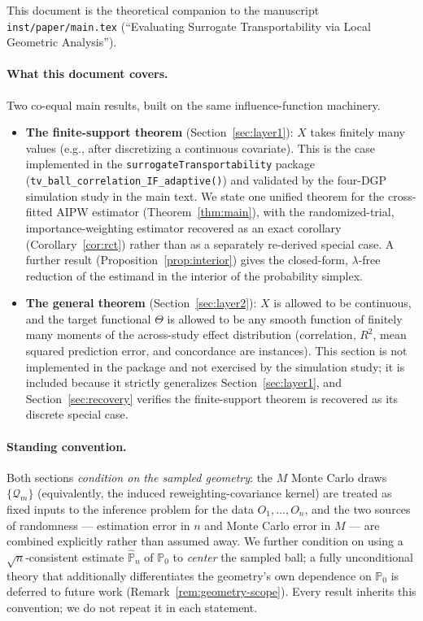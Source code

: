 \documentclass[11pt]{article}
\theoremstyle{plain}
\theoremstyle{definition}
\theoremstyle{remark}
\newcommand{\PP}{\mathbb{P}}
\newcommand{\Pn}{\widehat{\PP}_n}
\newcommand{\Q}{\mathcal{Q}}
\begin{document}
This document is the theoretical companion to the manuscript
\texttt{inst/paper/main.tex} (``Evaluating Surrogate Transportability via Local
Geometric Analysis'').

\paragraph{What this document covers.} Two co-equal main results, built on the same
influence-function machinery.

\begin{itemize}
  \item \textbf{The finite-support theorem} (Section~\ref{sec:layer1}): $X$ takes
  finitely many values (e.g., after discretizing a continuous covariate). This is the
  case implemented in the \texttt{surrogateTransportability} package
  (\texttt{tv\_ball\_correlation\_IF\_adaptive()}) and validated by the four-DGP
  simulation study in the main text. We state one unified theorem for the
  cross-fitted AIPW estimator (Theorem~\ref{thm:main}), with the randomized-trial,
  importance-weighting estimator recovered as an exact corollary
  (Corollary~\ref{cor:rct}) rather than as a separately re-derived special case. A
  further result (Proposition~\ref{prop:interior}) gives the closed-form,
  $\lambda$-free reduction of the estimand in the interior of the probability simplex.
  \item \textbf{The general theorem} (Section~\ref{sec:layer2}): $X$ is allowed to be
  continuous, and the target functional $\Theta$ is allowed to be any smooth function
  of finitely many moments of the across-study effect distribution (correlation,
  $R^2$, mean squared prediction error, and concordance are instances). This section
  is not implemented in the package and not exercised by the simulation study; it is
  included because it strictly generalizes Section~\ref{sec:layer1}, and
  Section~\ref{sec:recovery} verifies the finite-support theorem is recovered as its
  discrete special case.
\end{itemize}

\paragraph{Standing convention.} Both sections \emph{condition on the sampled
geometry}: the $M$ Monte Carlo draws $\{\Q_m\}$ (equivalently, the induced
reweighting-covariance kernel) are treated as fixed inputs to the inference problem
for the data $O_1,\dots,O_n$, and the two sources of randomness --- estimation error in
$n$ and Monte Carlo error in $M$ --- are combined explicitly rather than assumed away.
We further condition on using a $\sqrt n$-consistent estimate $\Pn$ of $\PP_0$ to
\emph{center} the sampled ball; a fully unconditional theory that additionally
differentiates the geometry's own dependence on $\PP_0$ is deferred to future work
(Remark~\ref{rem:geometry-scope}). Every result inherits this convention; we do not
repeat it in each statement.
\end{document}
